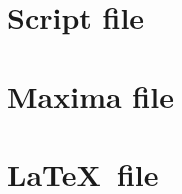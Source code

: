 \documentclass{article}
\begin{document}
\appendix

\section{Script file}



\section{Maxima file}



\section{\LaTeX~file}


\end{document}
